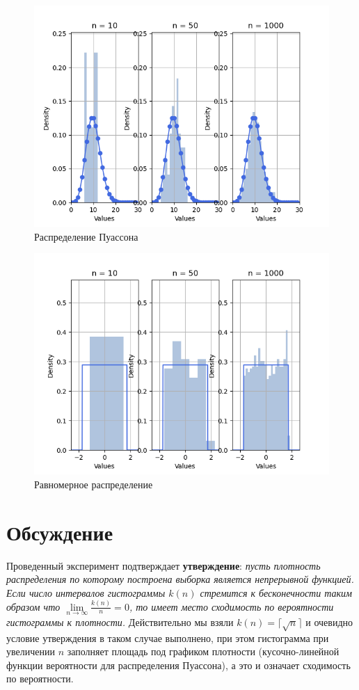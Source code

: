 \documentclass[12pt,a4paper]{article}
\begin{document}
\begin{figure}[h!]
	\centering
	\includegraphics[scale=0.8]{poisson.png}
	\caption{Распределение Пуассона}
	\label{fig:image}
\end{figure}

\pagebreak

\begin{figure}[h!]
	\centering
	\includegraphics[scale=0.8]{uniform.png}
	\caption{Равномерное распределение}
	\label{fig:image}
\end{figure}
\pagebreak

\section{Обсуждение}
Проведенный эксперимент подтверждает \textbf{утверждение}: \textit{пусть плотность распределения по которому построена выборка является непрерывной функцией. Если число интервалов гистограммы $k(n)$ стремится к бесконечности таким образом что $\lim\limits_{n\to\infty}{\frac{k(n)}{n}}=0$, то имеет место сходимость по вероятности гистограммы к плотности.}\cite{chernova} Действительно мы взяли $k(n)=\lceil\sqrt{n}\rceil$ и очевидно условие утверждения в таком случае выполнено, при этом гистограмма при увеличении $n$ заполняет площадь под графиком плотности (кусочно-линейной функции вероятности для распределения Пуассона), а это и означает сходимость по вероятности.
\pagebreak
\end{document}
